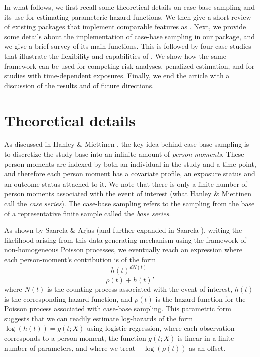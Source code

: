 \documentclass[
]{jss}
\begin{document}
In what follows, we first recall some theoretical details on case-base
sampling and its use for estimating parameteric hazard functions. We
then give a short review of existing  packages that
implement comparable features as . Next, we provide some
details about the implementation of case-base sampling in our package,
and we give a brief survey of its main functions. This is followed by
four case studies that illustrate the flexibility and capabilities of
. We show how the same framework can be used for competing
risk analyses, penalized estimation, and for studies with time-dependent
exposures. Finally, we end the article with a discussion of the results
and of future directions.

\hypertarget{theory}{%
\section{Theoretical details}\label{theory}}

As discussed in Hanley \& Miettinen \citeyearpar{hanley2009fitting}, the
key idea behind case-base sampling is to discretize the study base into
an infinite amount of \emph{person moments}. These person moments are
indexed by both an individual in the study and a time point, and
therefore each person moment has a covariate profile, an exposure status
and an outcome status attached to it. We note that there is only a
finite number of person moments associated with the event of interest
(what Hanley \& Miettinen call the \emph{case series}). The case-base
sampling refers to the sampling from the base of a representative finite
sample called the \emph{base series}.

As shown by Saarela \& Arjas \citeyearpar{saarela2015non} (and further
expanded in Saarela \citeyearpar{saarela2016case}), writing the
likelihood arising from this data-generating mechanism using the
framework of non-homogeneous Poisson processes, we eventually reach an
expression where each person-moment's contribution is of the form
\[\frac{h(t)^{dN(t)}}{\rho(t) + h(t)},\] where \(N(t)\) is the counting
process associated with the event of interest, \(h(t)\) is the
corresponding hazard function, and \(\rho(t)\) is the hazard function
for the Poisson process associated with case-base sampling. This
parametric form suggests that we can readily estimate log-hazards of the
form \(\log(h(t)) = g(t; X)\) using logistic regression, where each
observation corresponds to a person moment, the function \(g(t; X)\) is
linear in a finite number of parameters, and where we treat
\(-\log(\rho(t))\) as an offset.
\end{document}
